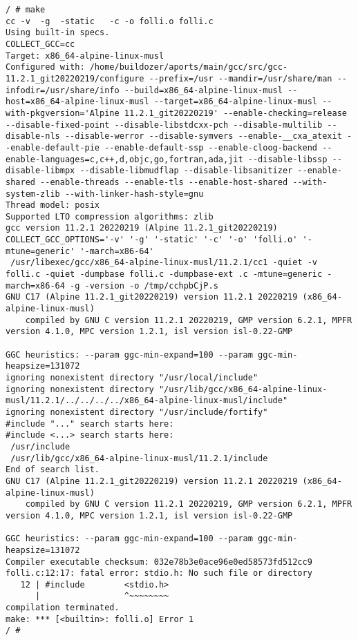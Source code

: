 \documentclass{article}  %
\begin{document}
\begin{verbatim}
/ # make
cc -v  -g  -static   -c -o folli.o folli.c
Using built-in specs.
COLLECT_GCC=cc
Target: x86_64-alpine-linux-musl
Configured with: /home/buildozer/aports/main/gcc/src/gcc-11.2.1_git20220219/configure --prefix=/usr --mandir=/usr/share/man --infodir=/usr/share/info --build=x86_64-alpine-linux-musl --host=x86_64-alpine-linux-musl --target=x86_64-alpine-linux-musl --with-pkgversion='Alpine 11.2.1_git20220219' --enable-checking=release --disable-fixed-point --disable-libstdcxx-pch --disable-multilib --disable-nls --disable-werror --disable-symvers --enable-__cxa_atexit --enable-default-pie --enable-default-ssp --enable-cloog-backend --enable-languages=c,c++,d,objc,go,fortran,ada,jit --disable-libssp --disable-libmpx --disable-libmudflap --disable-libsanitizer --enable-shared --enable-threads --enable-tls --enable-host-shared --with-system-zlib --with-linker-hash-style=gnu
Thread model: posix
Supported LTO compression algorithms: zlib
gcc version 11.2.1 20220219 (Alpine 11.2.1_git20220219) 
COLLECT_GCC_OPTIONS='-v' '-g' '-static' '-c' '-o' 'folli.o' '-mtune=generic' '-march=x86-64'
 /usr/libexec/gcc/x86_64-alpine-linux-musl/11.2.1/cc1 -quiet -v folli.c -quiet -dumpbase folli.c -dumpbase-ext .c -mtune=generic -march=x86-64 -g -version -o /tmp/cchpbCjP.s
GNU C17 (Alpine 11.2.1_git20220219) version 11.2.1 20220219 (x86_64-alpine-linux-musl)
	compiled by GNU C version 11.2.1 20220219, GMP version 6.2.1, MPFR version 4.1.0, MPC version 1.2.1, isl version isl-0.22-GMP

GGC heuristics: --param ggc-min-expand=100 --param ggc-min-heapsize=131072
ignoring nonexistent directory "/usr/local/include"
ignoring nonexistent directory "/usr/lib/gcc/x86_64-alpine-linux-musl/11.2.1/../../../../x86_64-alpine-linux-musl/include"
ignoring nonexistent directory "/usr/include/fortify"
#include "..." search starts here:
#include <...> search starts here:
 /usr/include
 /usr/lib/gcc/x86_64-alpine-linux-musl/11.2.1/include
End of search list.
GNU C17 (Alpine 11.2.1_git20220219) version 11.2.1 20220219 (x86_64-alpine-linux-musl)
	compiled by GNU C version 11.2.1 20220219, GMP version 6.2.1, MPFR version 4.1.0, MPC version 1.2.1, isl version isl-0.22-GMP

GGC heuristics: --param ggc-min-expand=100 --param ggc-min-heapsize=131072
Compiler executable checksum: 032e78b3e0ace96e0ed58573fd512cc9
folli.c:12:17: fatal error: stdio.h: No such file or directory
   12 | #include        <stdio.h>
      |                 ^~~~~~~~~
compilation terminated.
make: *** [<builtin>: folli.o] Error 1
/ # 
\end{verbatim}
\end{document}
